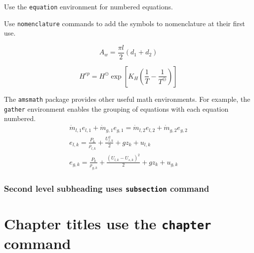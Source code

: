 \documentclass[openany, 12pt]{book}
\begin{document}
{{Use the \texttt{equation} environment for numbered equations.
{%
Use \texttt{nomenclature} commands to add the symbols to nomenclature at their first use.

{%
\begin{equation}
    A_w = \frac{\pi l}{2}\left(d_1 + d_2\right)
\end{equation}

{%

{%
\begin{equation}
    H^{cp} = H^\ominus \exp\left[K_H\left(\frac{1}{T}-\frac{1}{T^\ominus}\right)\right]
\end{equation}

{%

{%
The \texttt{amsmath} package provides other useful math environments.
For example, the \texttt{gather} environment enables the grouping of equations with each equation numbered.
\begin{gather}
    \dot{m}_{l,1}e_{l,1} + \dot{m}_{g,1}e_{g,1} = \dot{m}_{l,2}e_{l,2} + \dot{m}_{g,2}e_{g,2} \label{eq:energy-conservation} \\
    e_{l,k} = \frac{P_k}{\rho_{l,k}} + \frac{U^2_{l,k}}{2} + gz_k + u_{l,k} \label{eq:liquid-energy} \\
    e_{g,k} = \frac{P_k}{\rho_{g,k}} + \frac{\left(U_{l,k}-U_{s,k}\right)^2}{2} + gz_k + u_{g,k} \label{eq:gas-energy}
\end{gather}

\subsection{Second level subheading uses \texttt{subsection} command}

\chapter{Chapter titles use the \texttt{chapter} command}

}}}}}}}}
\end{document}
